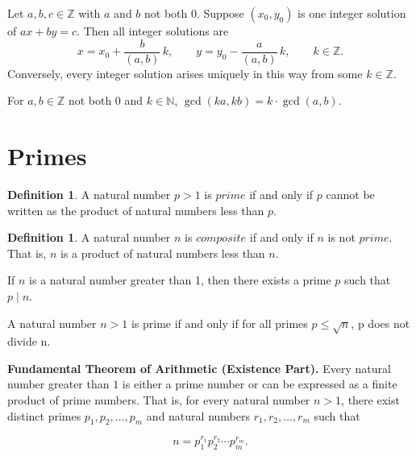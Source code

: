 \documentclass{article}
\theoremstyle{definition}
\newtheorem{definition}{Definition}
\newtheorem*{definition*}{Definition}
\newenvironment{manualtheorem}[1]{%
  \renewcommand{\thetheorem}{#1}%
  \theorem%
}{%
  \endtheorem%
}
\begin{document}
\begin{manualtheorem}{1.53}
	Let $a,b,c \in \mathbb{Z}$ with $a$ and $b$ not both $0$. Suppose $(x_0,y_0)$ is one integer solution of $ax+by=c$. Then all integer solutions are
	\[
		x = x_0 + \frac{b}{(a,b)}\,k,\qquad
		y = y_0 - \frac{a}{(a,b)}\,k,\qquad k \in \mathbb{Z}.
	\]
	Conversely, every integer solution arises uniquely in this way from some $k \in \mathbb{Z}$.
\end{manualtheorem}

\begin{manualtheorem}{1.55}
	For $a,b \in \mathbb{Z}$ not both $0$ and $k \in \mathbb{N}$, \quad $\gcd(ka,kb)=k\cdot \gcd(a,b)$.
\end{manualtheorem}



\pagebreak

\section{Primes}
\begin{definition*}
	A natural number $p > 1$ is $prime$ if and only if $p$ cannot be written as
	the product of natural numbers less than $p$.
\end{definition*}

\begin{definition}
	A natural number $n$ is $composite$ if and only if $n$ is not $prime$. That is,
	$n$ is a product of natural numbers less than $n$.
\end{definition}

\begin{manualtheorem}{2.1}
	If $n$ is a natural number greater than 1, then there exists a prime $p$
	such that $p \mid n$.
\end{manualtheorem}

\begin{manualtheorem}{2.3}
	A natural number $n > 1$ is prime if and only if for all primes $p \leq \sqrt{n}$,
	p does not divide n.
\end{manualtheorem}

\begin{manualtheorem}{2.7}
	\textbf{Fundamental Theorem of Arithmetic (Existence Part).}
	Every natural number greater than $1$ is either a prime number or can be expressed as a finite product of prime numbers.
	That is, for every natural number $n > 1$, there exist distinct primes $p_1, p_2, \ldots, p_m$ and natural numbers $r_1, r_2, \ldots, r_m$ such that

	\[
		n = p_1^{r_1} p_2^{r_2} \cdots p_m^{r_m}.
	\]
\end{manualtheorem}
\end{document}

